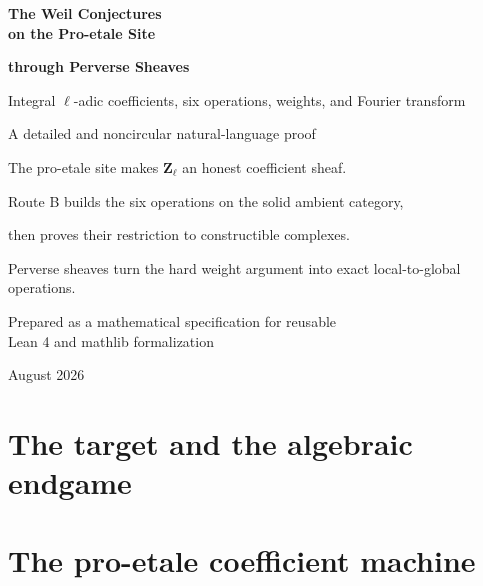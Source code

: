 \documentclass[11pt,openany]{book}
\theoremstyle{definition}
\theoremstyle{remark}
\newcommand{\Zl}{\mathbf Z_\ell}
\begin{document}
\frontmatter
\begin{titlepage}
  \centering
  \vspace*{1.7cm}
  {\Huge\bfseries\color{deepblue}
    The Weil Conjectures\\[0.25em]
    on the Pro-etale Site\par}
  \vspace{0.55cm}
  {\LARGE\bfseries\color{perverseviolet}
    through Perverse Sheaves\par}
  \vspace{0.9cm}
  {\Large Integral \(\ell\)-adic coefficients, six operations, weights,
    and Fourier transform\par}
  \vspace{1.2cm}
  {\large A detailed and noncircular natural-language proof\par}
  \vfill
  \begin{tcolorbox}[
    width=0.88\textwidth,colback=paleproetale,colframe=proetaleteal,
    boxrule=0.7pt,arc=1.5mm]
  \centering
  The pro-etale site makes \(\Zl\) an honest coefficient sheaf.\par
  Route B builds the six operations on the solid ambient category,\par
  then proves their restriction to constructible complexes.\par
  Perverse sheaves turn the hard weight argument into exact
  local-to-global operations.
  \end{tcolorbox}
  \vfill
  {\large Prepared as a mathematical specification for reusable\\
  Lean 4 and mathlib formalization\par}
  \vspace{0.7cm}
  {\large August 2026\par}
\end{titlepage}


\tableofcontents

\mainmatter
\part{The target and the algebraic endgame}



\part{The pro-etale coefficient machine}
\label{part:proetale-machine}






\end{document}
